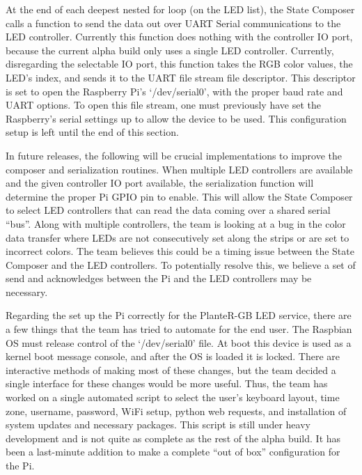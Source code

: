 \documentclass[onecolumn, draftclsnofoot,10pt, compsoc]{IEEEtran}
\begin{document}
	\noindent At the end of each deepest nested for loop (on the LED list), the State Composer calls a function to send the data out over UART
	Serial communications to the LED controller. Currently this function does nothing with the controller IO port, because the current alpha build
	only uses a single LED controller. Currently, disregarding the selectable IO port, this function takes the RGB color values, the LED’s index,
	and sends it to the UART file stream file descriptor. This descriptor is set to open the Raspberry Pi’s ‘/dev/serial0’, with the proper baud rate
	and UART options. To open this file stream, one must previously have set the Raspberry’s serial settings up to allow the device to be used. This
	configuration setup is left until the end of this section.

	\noindent In future releases, the following will be crucial implementations to improve the composer and serialization routines. When multiple LED
	controllers are available and the given controller IO port available, the serialization function will determine the proper Pi GPIO pin to enable.
	This will allow the State Composer to select LED controllers that can read the data coming over a shared serial “bus”. Along with multiple
	controllers, the team is looking at a bug in the color data transfer where LEDs are not consecutively set along the strips or are set to incorrect
	colors. The team believes this could be a timing issue between the State Composer and the LED controllers. To potentially resolve this, we believe
	a set of send and acknowledges between the Pi and the LED controllers may be necessary.

	\noindent Regarding the set up the Pi correctly for the PlanteR-GB LED service, there are a few things that the team has tried to automate for the
	end user. The Raspbian OS must release control of the ‘/dev/serial0’ file. At boot this device is used as a kernel boot message console, and after
	the OS is loaded it is locked. There are interactive methods of making most of these changes, but the team decided a single interface for these
	changes would be more useful. Thus, the team has worked on a single automated script to select the user’s keyboard layout, time zone, username,
	password, WiFi setup, python web requests, and installation of system updates and necessary packages. This script is still under heavy development
	and is not quite as complete as the rest of the alpha build. It has been a last-minute addition to make a complete “out of box” configuration for the Pi.
\end{document}
